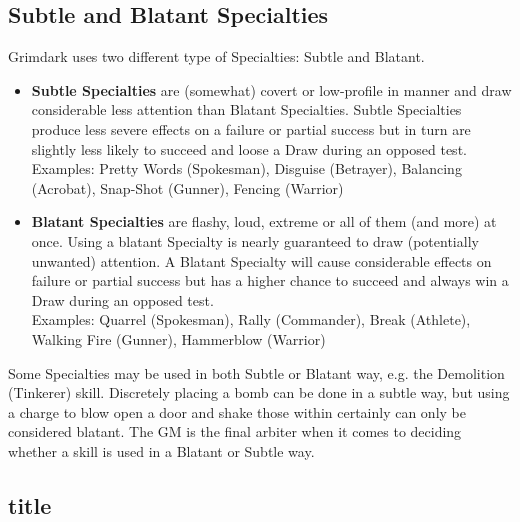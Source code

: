 \subsection{Subtle and Blatant Specialties}
\label{skill_types}
Grimdark uses two different type of Specialties: Subtle and Blatant.
\begin{itemize}
	\item \textbf{Subtle Specialties} are (somewhat) covert or low-profile in manner and draw considerable less attention than Blatant Specialties. 
	Subtle Specialties produce less severe effects on a failure or partial success but in turn are slightly less likely to succeed and loose a Draw during an opposed test.\\
	Examples: Pretty Words (Spokesman), Disguise (Betrayer), Balancing (Acrobat), Snap-Shot (Gunner), Fencing (Warrior)

	\item \textbf{Blatant Specialties} are flashy, loud, extreme or all of them (and more) at once. 
	Using a blatant Specialty is nearly guaranteed to draw (potentially unwanted) attention.
	A Blatant Specialty will cause considerable effects on failure or partial success but has a higher chance to succeed and always win a Draw during an opposed test.\\
	Examples: Quarrel (Spokesman), Rally (Commander), Break (Athlete), Walking Fire (Gunner), Hammerblow (Warrior)
\end{itemize}
Some Specialties may be used in both Subtle or Blatant way, e.g. the Demolition (Tinkerer) skill. 
Discretely placing a bomb can be done in a subtle way, but using a charge to blow open a door and shake those within certainly can only be considered blatant.
The GM is the final arbiter when it comes to deciding whether a skill is used in a Blatant or Subtle way.


\subsection{title}

